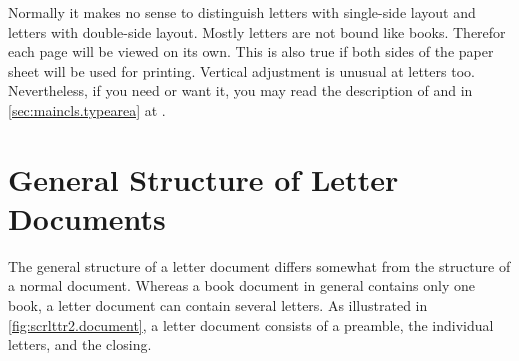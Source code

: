 Normally it makes no sense to distinguish letters with single-side layout and
letters with double-side layout. Mostly letters are not bound like
books. Therefor each page will be viewed on its own. This is also true if both
sides of the paper sheet will be used for printing. Vertical adjustment is
unusual at letters too. Nevertheless, if you need or want it, you may read the
description of  and  in
\autoref{sec:maincls.typearea} at .%
%


\section{General Structure of Letter Documents}
\label{sec:scrlttr2.document}

The general structure of a letter document differs somewhat from the
structure of a normal document. Whereas a book document in general
contains only one book, a letter document can contain several
letters. As illustrated in \autoref{fig:scrlttr2.document}, a letter
document consists of a preamble, the individual letters, and the
closing.


